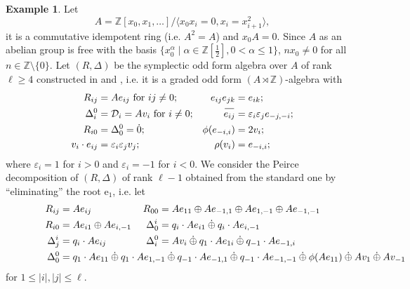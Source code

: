 \documentclass{article}
\theoremstyle{definition}
\newtheorem{example}{Example}
\newcommand{\dotoplus}{\mathbin{\dot{\oplus}}}
\newcommand{\eps}{\varepsilon}
\newcommand{\inv}[1]{
    \!\;\overline{
        \!\!\:#1\vphantom !\!\!\:
    }\;\!
}
\begin{document}
\begin{example}
    Let \[
        A = \mathbb Z[x_0, x_1, \ldots] / \langle
            x_0 x_i = 0, x_i = x_{i + 1}^2
        \rangle,
    \] it is a commutative idempotent ring (i.e. \(A^2 = A\)) and \(x_0 A = 0\). Since \(A\) as an abelian group is free with the basis \(
        \{
            x_0^\alpha
            \mid
            \alpha \in \mathbb Z[\frac 12],
            0 < \alpha \leq 1
        \}
    \), \(nx_0 \neq 0\) for all \(
        n \in \mathbb Z \setminus \{0\}
    \). Let \((R, \Delta)\) be the symplectic odd form algebra over \(A\) of rank \(\ell \geq 4\) constructed in \cite[\S 2.3]{thesis} and \cite[\S 5]{classic-ofa}, i.e. it is a graded odd form \((A \rtimes \mathbb Z)\)-algebra with
    \begin{align*}
        R_{ij} &= A e_{ij} \text{ for } ij \neq 0;
        &
        e_{ij} e_{jk} &= e_{ik};
        \\
        \Delta^0_i &= \mathcal D_i = A v_i
        \text{ for } i \neq 0;
        &
        \inv{e_{ij}} &= \eps_i \eps_j e_{-j, -i};
        \\
        R_{i0} &= \Delta^0_0 = \dot 0;
        &
        \phi(e_{-i, i}) &= 2 v_i;
        \\
        v_i \cdot e_{ij} &= \eps_i \eps_j v_j;
        &
        \rho(v_i) &= e_{-i, i};
    \end{align*}
    where \(\eps_i = 1\) for \(i > 0\) and \(\eps_i = -1\) for \(i < 0\). We consider the Peirce decomposition of \((R, \Delta)\) of rank \(\ell - 1\) obtained from the standard one by ``eliminating'' the root \(\mathrm e_1\), i.e. let
    \begin{align*}
        R_{ij} &= A e_{ij}
        &
        R_{00}
        &=
        Ae_{11}
        \oplus Ae_{-1, 1}
        \oplus Ae_{1, -1}
        \oplus Ae_{-1, -1}
        \\
        R_{i0} &= Ae_{i1} \oplus Ae_{i, -1}
        &
        \Delta^i_0
        &=
        q_i \cdot Ae_{i1}
        \dotoplus q_i \cdot Ae_{i, -1}
        \\
        \Delta^i_j &= q_i \cdot Ae_{ij}
        &
        \Delta^0_i
        &=
        Av_i
        \dotoplus q_1 \cdot Ae_{1i}
        \dotoplus q_{-1} \cdot Ae_{-1, i}
        \\
        \Delta^0_0
        &=
        q_1 \cdot Ae_{11}
        \dotoplus q_1 \cdot Ae_{1, -1}
        \dotoplus q_{-1} \cdot Ae_{-1, 1}
        \dotoplus q_{-1} \cdot Ae_{-1, -1}
        \dotoplus \phi(Ae_{11})
        \dotoplus Av_1
        \dotoplus Av_{-1}\mkern-500mu
    \end{align*}
    for \(
        1 \leq |i|, |j| \leq \ell
    \).


\end{example}
\end{document}
